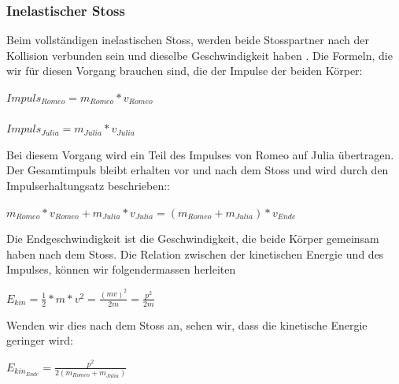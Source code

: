 \documentclass[../main.tex]{subfiles}
\begin{document}
\subsubsection{Inelastischer Stoss}
Beim vollständigen inelastischen Stoss, werden beide Stosspartner nach der Kollision verbunden sein und dieselbe
Geschwindigkeit haben \cite{tiplerpaula.PhysikFurStudierende}. Die Formeln, die wir für diesen Vorgang brauchen sind,
die der Impulse der beiden Körper:
\begin{mdframed}
$Impuls_{Romeo} = m_{Romeo}*v_{Romeo}$\\\\
$Impuls_{Julia} = m_{Julia}*v_{Julia}$
\end{mdframed}
 Bei diesem Vorgang wird ein Teil des Impulses von Romeo auf Julia übertragen. Der Gesamtimpuls bleibt erhalten vor
 und nach dem Stoss und wird durch den Impulserhaltungsatz beschrieben:\cite{tiplerpaula.PhysikFurStudierende}:
\begin{mdframed}
$ m_{Romeo}*v_{Romeo} +  m_{Julia}*v_{Julia} = (m_{Romeo} + m_{Julia})*v_{Ende}$
\end{mdframed}
Die Endgeschwindigkeit ist die Geschwindigkeit, die beide Körper gemeinsam haben nach dem Stoss.\newline
Die Relation zwischen der kinetischen Energie und des Impulses, können wir folgendermassen
herleiten %
\begin{mdframed}
$E_{kin}=\frac{1}{2} * m * v^{2} = \frac{(mv)^{2}}{2m} = \frac{p^{2}}{2m}$
\end{mdframed}
Wenden wir dies nach dem Stoss an, sehen wir, dass die kinetische Energie geringer wird:
\begin{mdframed}
$E_{kin_{Ende}}=\frac{p^{2}}{2(m_{Romeo} + m_{Julia})} $
\end{mdframed}
\end{document}

